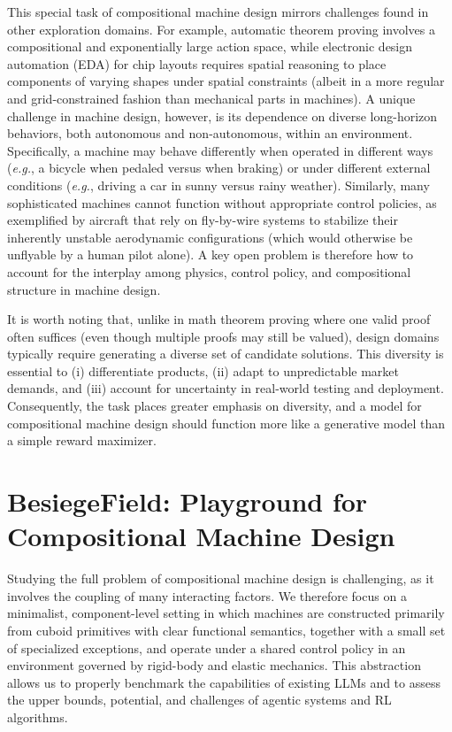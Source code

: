 \documentclass{article} %
\makeatletter
\newcommand*{\eg}{{\it e.g.}\@\xspace}
\newcommand{\envname}{\textbf{BesiegeField}\xspace}
\theoremstyle{plain}
\theoremstyle{definition}
\makeatother
\begin{document}
This special task of compositional machine design mirrors challenges found in other exploration domains. For example, automatic theorem proving involves a compositional and exponentially large action space, while electronic design automation (EDA) for chip layouts requires spatial reasoning to place components of varying shapes under spatial constraints (albeit in a more regular and grid-constrained fashion than mechanical parts in machines). A unique challenge in machine design, however, is its dependence on diverse long-horizon behaviors, both autonomous and non-autonomous, within an environment. Specifically, a machine may behave differently when operated in different ways (\eg, a bicycle when pedaled versus when braking) or under different external conditions (\eg, driving a car in sunny versus rainy weather). Similarly, many sophisticated machines cannot function without appropriate control policies, as exemplified by aircraft that rely on fly-by-wire systems to stabilize their inherently unstable aerodynamic configurations (which would otherwise be unflyable by a human pilot alone). A key open problem is therefore how to account for the interplay among physics, control policy, and compositional structure in machine design.


It is worth noting that, unlike in math theorem proving where one valid proof often suffices (even though multiple proofs may still be valued), design domains typically require generating a diverse set of candidate solutions. This diversity is essential to (i) differentiate products, (ii) adapt to unpredictable market demands, and (iii) account for uncertainty in real-world testing and deployment. Consequently, the task places greater emphasis on diversity, and a model for compositional machine design should function more like a generative model than a simple reward maximizer.

\vspace{-2mm}
\section{\envname: Playground for Compositional Machine Design}
\vspace{-2mm}


Studying the full problem of compositional machine design is challenging, as it involves the coupling of many interacting factors.
We therefore focus on a minimalist, component-level setting in which machines are constructed primarily from cuboid primitives with clear functional semantics, together with a small set of specialized exceptions, and operate under a shared control policy in an environment governed by rigid-body and elastic mechanics. This abstraction allows us to properly benchmark the capabilities of existing LLMs and to assess the upper bounds, potential, and challenges of agentic systems and RL algorithms.
\end{document}
